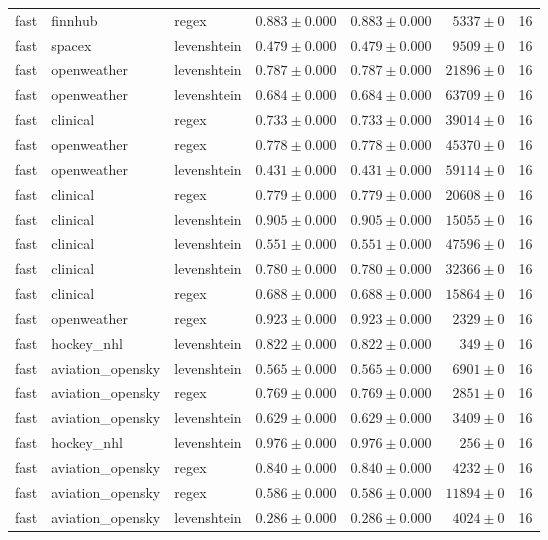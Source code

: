 \begin{table}[htbp]
\begin{tabular}{l l l r r r r}
fast & finnhub & regex & $0.883\pm0.000$ & $0.883\pm0.000$ & $5337\pm0$ & 16 \\
fast & spacex & levenshtein & $0.479\pm0.000$ & $0.479\pm0.000$ & $9509\pm0$ & 16 \\
fast & openweather & levenshtein & $0.787\pm0.000$ & $0.787\pm0.000$ & $21896\pm0$ & 16 \\
fast & openweather & levenshtein & $0.684\pm0.000$ & $0.684\pm0.000$ & $63709\pm0$ & 16 \\
fast & clinical & regex & $0.733\pm0.000$ & $0.733\pm0.000$ & $39014\pm0$ & 16 \\
fast & openweather & regex & $0.778\pm0.000$ & $0.778\pm0.000$ & $45370\pm0$ & 16 \\
fast & openweather & levenshtein & $0.431\pm0.000$ & $0.431\pm0.000$ & $59114\pm0$ & 16 \\
fast & clinical & regex & $0.779\pm0.000$ & $0.779\pm0.000$ & $20608\pm0$ & 16 \\
fast & clinical & levenshtein & $0.905\pm0.000$ & $0.905\pm0.000$ & $15055\pm0$ & 16 \\
fast & clinical & levenshtein & $0.551\pm0.000$ & $0.551\pm0.000$ & $47596\pm0$ & 16 \\
fast & clinical & levenshtein & $0.780\pm0.000$ & $0.780\pm0.000$ & $32366\pm0$ & 16 \\
fast & clinical & regex & $0.688\pm0.000$ & $0.688\pm0.000$ & $15864\pm0$ & 16 \\
fast & openweather & regex & $0.923\pm0.000$ & $0.923\pm0.000$ & $2329\pm0$ & 16 \\
fast & hockey\_nhl & levenshtein & $0.822\pm0.000$ & $0.822\pm0.000$ & $349\pm0$ & 16 \\
fast & aviation\_opensky & levenshtein & $0.565\pm0.000$ & $0.565\pm0.000$ & $6901\pm0$ & 16 \\
fast & aviation\_opensky & regex & $0.769\pm0.000$ & $0.769\pm0.000$ & $2851\pm0$ & 16 \\
fast & aviation\_opensky & levenshtein & $0.629\pm0.000$ & $0.629\pm0.000$ & $3409\pm0$ & 16 \\
fast & hockey\_nhl & levenshtein & $0.976\pm0.000$ & $0.976\pm0.000$ & $256\pm0$ & 16 \\
fast & aviation\_opensky & regex & $0.840\pm0.000$ & $0.840\pm0.000$ & $4232\pm0$ & 16 \\
fast & aviation\_opensky & regex & $0.586\pm0.000$ & $0.586\pm0.000$ & $11894\pm0$ & 16 \\
fast & aviation\_opensky & levenshtein & $0.286\pm0.000$ & $0.286\pm0.000$ & $4024\pm0$ & 16 \\

\end{tabular}
\end{table}
